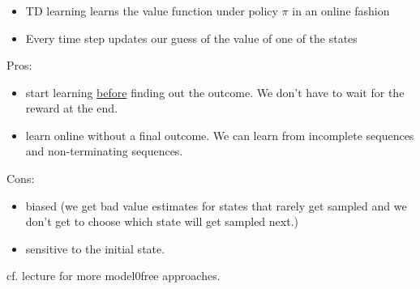 \begin{frame}\frametitle{\subsubsecname}

\begin{itemize}
\item TD learning learns the value function under policy $\pi$ in an online fashion
\item Every time step updates our guess of the value of one of the states
\end{itemize}

\vspace{10mm}

Pros:
\begin{itemize}
	\item start learning \underline{before} finding out the outcome. We don't have to wait for the reward at the end.
	\item learn online without a final outcome. We can learn from incomplete sequences and non-terminating sequences.
\end{itemize}

Cons:
\pause
\begin{itemize}
	\item biased (we get bad value estimates for states that rarely get sampled and we don't get to choose which state will get sampled next.)
	\item sensitive to the initial state.
\end{itemize}

cf. lecture for more model0free approaches.%

\end{frame}

